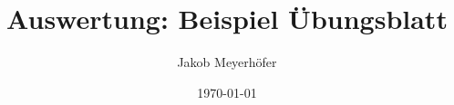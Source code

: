 


\title{Auswertung: Beispiel Übungsblatt}


\author{Jakob Meyerhöfer}


\newcommand\bachelor{Bachelorarbeit}


\date{\today}


\newcommand\pdfsubject{Computer Science}


\newcommand\pdfkeywords{Error Messages, Programming, Learning}


\newcommand\pdfproducer{LaTeX}


\newcommand\pdfcreator{TeX}


